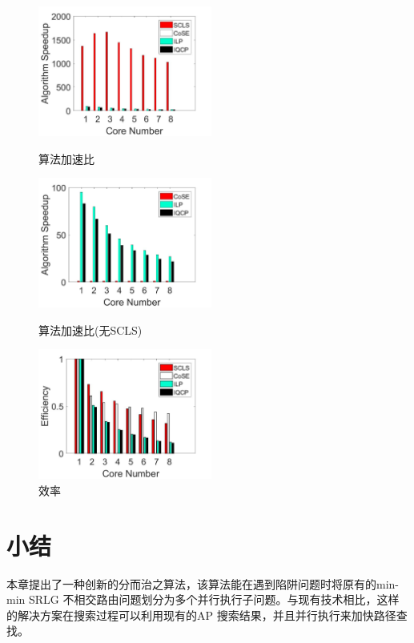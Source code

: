 \begin{figure}[htbp]
\centering
\begin{minipage}[t]{0.3\linewidth}
\centering
\includegraphics[width=2.25in]{figures/Multiple}
\caption{算法加速比}
\label{fig:Multiple}
\end{minipage}
\hfill
\begin{minipage}[t]{0.3\linewidth}
\centering
\includegraphics[width=2.25in]{figures/MultipleNoSCLS}
\caption{算法加速比(无SCLS)}
\label{fig:MultipleNoSCLS}
\end{minipage}
\hfill
\begin{minipage}[t]{0.3\linewidth}
\centering
\includegraphics[width=2.25in]{figures/Efficiency}
 \caption{效率}
 \label{fig:Efficiency}
\end{minipage}
\end{figure}
\section{小结}
本章提出了一种创新的分而治之算法，该算法能在遇到陷阱问题时将原有的min-min SRLG 不相交路由问题划分为多个并行执行子问题。与现有技术相比，这样的解决方案在搜索过程可以利用现有的AP 搜索结果，并且并行执行来加快路径查找。


